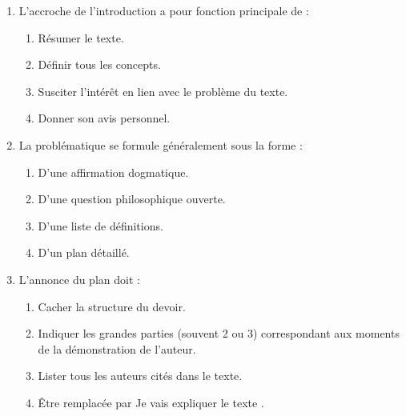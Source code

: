 \documentclass[11pt]{article}
\begin{document}
\begin{exercice}
\begin{enumerate}
    \item L'\og accroche \fg{} de l'introduction a pour fonction principale de :
    \begin{enumerate}
        \item Résumer le texte.
        \item Définir tous les concepts.
        \item Susciter l'intérêt en lien avec le problème du texte.
        \item Donner son avis personnel.
    \end{enumerate}
    \item La \og problématique \fg{} se formule généralement sous la forme :
    \begin{enumerate}
        \item D'une affirmation dogmatique.
        \item D'une question philosophique ouverte.
        \item D'une liste de définitions.
        \item D'un plan détaillé.
    \end{enumerate}
    \item L'annonce du plan doit :
    \begin{enumerate}
        \item Cacher la structure du devoir.
        \item Indiquer les grandes parties (souvent 2 ou 3) correspondant aux moments de la démonstration de l'auteur.
        \item Lister tous les auteurs cités dans le texte.
        \item Être remplacée par \og Je vais expliquer le texte \fg.
    \end{enumerate}
\end{enumerate}
\end{exercice}
\end{document}
